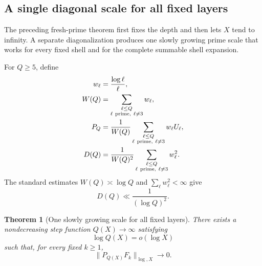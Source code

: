 \documentclass[11pt]{amsart}
\numberwithin{equation}{section}
\theoremstyle{plain}
\newtheorem{theorem}{Theorem}[section]
\theoremstyle{definition}
\theoremstyle{remark}
\begin{document}
\subsection{A single diagonal scale for all fixed layers}
\label{subsec:single_diagonal_scale}

The preceding fresh-prime theorem first fixes the depth and then lets $X$ tend to infinity.  A separate diagonalization produces one slowly growing prime scale that works for every fixed shell and for the complete summable shell expansion.

For $Q\geq5$, define
\begin{align}
w_\ell
&=
\frac{\log\ell}{\ell},
\label{eq:diagonal_prime_weights}
\\
W(Q)
&=
\sum_{\substack{\ell\leq Q\\\ell\ {\rm prime},\ \ell\neq3}}w_\ell,
\label{eq:diagonal_prime_weight_sum}
\\
P_Q
&=
\frac1{W(Q)}
\sum_{\substack{\ell\leq Q\\\ell\ {\rm prime},\ \ell\neq3}}
w_\ell U_\ell,
\label{eq:diagonal_prime_average}
\\
D(Q)
&=
\frac1{W(Q)^2}
\sum_{\substack{\ell\leq Q\\\ell\ {\rm prime},\ \ell\neq3}}w_\ell^2.
\label{eq:diagonal_prime_ratio}
\end{align}
The standard estimates $W(Q)\asymp\log Q$ and $\sum_\ell w_\ell^2<\infty$ give
\begin{equation}
D(Q)\ll\frac1{(\log Q)^2}.
\label{eq:diagonal_prime_ratio_decay}
\end{equation}

\begin{theorem}[One slowly growing scale for all fixed layers]
\label{thm:single_slow_scale_all_layers}
There exists a nondecreasing step function $Q(X)\to\infty$ satisfying
\begin{equation}
\log Q(X)=o(\log X)
\label{eq:slow_scale_subpower_condition}
\end{equation}
such that, for every fixed $k\geq1$,
\begin{equation}
\|P_{Q(X)}F_k\|_{\log,X}\longrightarrow0.
\label{eq:single_scale_fixed_layer_contraction}
\end{equation}
\end{theorem}
\end{document}
